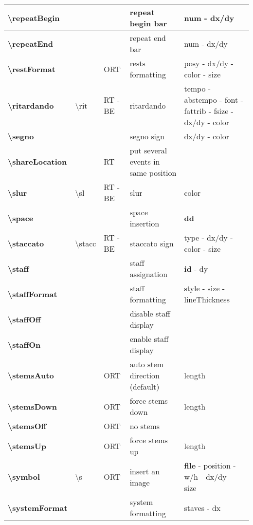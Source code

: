 \documentclass[a4paper, landscape, 10pt]{article}
\begin{document}
\begin{tabularx}{\linewidth}{p{3cm}p{4.5cm}p{3cm}p{5.5cm}l}
    \hline
    \textbf{\textbackslash{}repeatBegin}&&&repeat begin bar&num - dx/dy\\
    \hline
    \textbf{\textbackslash{}repeatEnd}&&&repeat end bar&num - dx/dy\\
    \hline
    \textbf{\textbackslash{}restFormat}&&ORT&rests formatting&posy - dx/dy - color - size\\
    \hline
    \textbf{\textbackslash{}ritardando}&\textbackslash{}rit&RT - BE&ritardando&tempo - abstempo - font - fattrib - fsize - dx/dy - color\\
    \hline
    \textbf{\textbackslash{}segno}&&&segno sign&dx/dy - color\\
    \hline
    \textbf{\textbackslash{}shareLocation}&&RT&put several events in same position&\\
    \hline
    \textbf{\textbackslash{}slur}&\textbackslash{}sl&RT - BE&slur&color\\
    \hline
    \textbf{\textbackslash{}space}&&&space insertion&\textbf{dd}\\
    \hline
    \textbf{\textbackslash{}staccato}&\textbackslash{}stacc&RT - BE&staccato sign&type - dx/dy - color - size\\
    \hline
    \textbf{\textbackslash{}staff}&&&staff assignation&\textbf{id} - dy\\
    \hline
    \textbf{\textbackslash{}staffFormat}&&&staff formatting&style - size - lineThickness\\
    \hline
    \textbf{\textbackslash{}staffOff}&&&disable staff display&\\
    \hline
    \textbf{\textbackslash{}staffOn}&&&enable staff display&\\
    \hline
    \textbf{\textbackslash{}stemsAuto}&&ORT&auto stem direction (default)&length\\
    \hline
    \textbf{\textbackslash{}stemsDown}&&ORT&force stems down&length\\
	\hline
    \textbf{\textbackslash{}stemsOff}&&ORT&no stems&\\
    \hline
    \textbf{\textbackslash{}stemsUp}&&ORT&force stems up&length\\
    \hline
    \textbf{\textbackslash{}symbol}&\textbackslash{}s&ORT&insert an image&\textbf{file} - position - w/h - dx/dy - size\\
    \hline
    \textbf{\textbackslash{}systemFormat}&&&system formatting&staves - dx\\ %

\end{tabularx}
\end{document}
